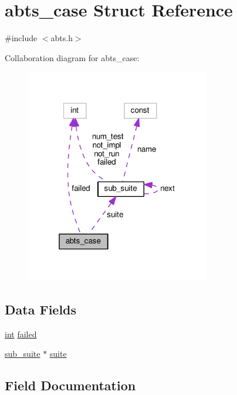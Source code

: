 \hypertarget{structabts__case}{}\section{abts\+\_\+case Struct Reference}
\label{structabts__case}


{\ttfamily \#include $<$abts.\+h$>$}



Collaboration diagram for abts\+\_\+case\+:
\nopagebreak
\begin{figure}[H]
\begin{center}
\leavevmode
\includegraphics[width=229pt]{structabts__case__coll__graph}
\end{center}
\end{figure}
\subsection*{Data Fields}
\begin{DoxyCompactItemize}
\item 
\hyperlink{pcre_8txt_a42dfa4ff673c82d8efe7144098fbc198}{int} \hyperlink{structabts__case_a632ebd793060b90c61b2c3599638d405}{failed}
\item 
\hyperlink{structsub__suite}{sub\+\_\+suite} $\ast$ \hyperlink{structabts__case_aefa5e913449f9ba0cb041e9fe088561b}{suite}
\end{DoxyCompactItemize}


\subsection{Field Documentation}
